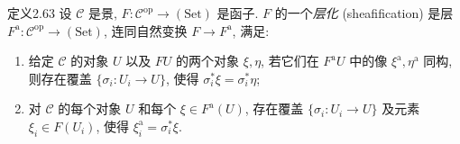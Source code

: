 \begin{origstatement}{定义}{2.63}\label{ch02:def263}
设 $\mathcal C$ 是景, $F:\mathcal C^{\mathrm{op}}\to(\mathrm{Set})$ 是函子. $F$ 的一个\emph{层化} (sheafification) 是层 $F^{\mathrm a}:\mathcal C^{\mathrm{op}}\to(\mathrm{Set})$, 连同自然变换 $F\to F^{\mathrm a}$, 满足:
\begin{enumerate}
\item[(i)] 给定 $\mathcal C$ 的对象 $U$ 以及 $FU$ 的两个对象 $\xi,\eta$, 若它们在 $F^{\mathrm a}U$ 中的像 $\xi^{\mathrm a},\eta^{\mathrm a}$ 同构, 则存在覆盖 $\{\sigma_i:U_i\to U\}$, 使得 $\sigma_i^*\xi=\sigma_i^*\eta$;
\item[(ii)] 对 $\mathcal C$ 的每个对象 $U$ 和每个 $\xi\in F^{\mathrm a}(U)$, 存在覆盖 $\{\sigma_i:U_i\to U\}$ 及元素 $\xi_i\in F(U_i)$, 使得 $\xi_i^{\mathrm a}=\sigma_i^*\xi$.
\end{enumerate}
\end{origstatement}

